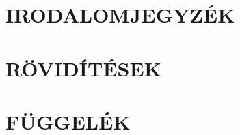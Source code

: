 

\clearpage
\section{IRODALOMJEGYZÉK}
\printbibliography[heading=none]

\clearpage
\renewcommand{\listfigurename}{ÁBRAJEGYZÉK}
\listoffigures


\clearpage
\section{RÖVIDÍTÉSEK}



\clearpage
\section*{FÜGGELÉK}




